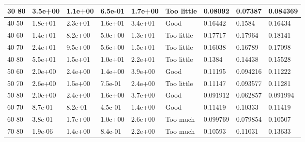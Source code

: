 \begin{tabular}{lllllllll}
30  80 & 3.5e+00 & 1.1e+00 & 6.5e-01 & 1.7e+00 & Too little & 0.08092 & 0.07387 & 0.084369 \\ \hline 
40  50 & 1.8e+01 & 2.3e+01 & 1.6e+01 & 3.4e+01 & Good & 0.16442 & 0.1584 & 0.16434 \\ \hline 
40  60 & 1.4e+01 & 8.2e+00 & 5.0e+00 & 1.3e+01 & Too little & 0.17717 & 0.17964 & 0.18141 \\ \hline 
40  70 & 2.4e+01 & 9.5e+00 & 5.6e+00 & 1.5e+01 & Too little & 0.16038 & 0.16789 & 0.17098 \\ \hline 
40  80 & 5.5e+01 & 1.5e+01 & 1.0e+01 & 2.2e+01 & Too little & 0.1384 & 0.14438 & 0.15528 \\ \hline 
50  60 & 2.0e+00 & 2.4e+00 & 1.4e+00 & 3.9e+00 & Good & 0.11195 & 0.094216 & 0.11222 \\ \hline 
50  70 & 2.6e+00 & 1.5e+00 & 7.5e-01 & 2.4e+00 & Too little & 0.11147 & 0.093577 & 0.11281 \\ \hline 
50  80 & 2.0e+00 & 2.4e+00 & 1.6e+00 & 3.7e+00 & Good & 0.091912 & 0.062857 & 0.091994 \\ \hline 
60  70 & 8.7e-01 & 8.2e-01 & 4.5e-01 & 1.4e+00 & Good & 0.11419 & 0.10333 & 0.11419 \\ \hline 
60  80 & 3.8e-01 & 1.7e+00 & 1.0e+00 & 2.6e+00 & Too much & 0.099769 & 0.079854 & 0.10507 \\ \hline 
70  80 & 1.9e-06 & 1.4e+00 & 8.4e-01 & 2.2e+00 & Too much & 0.10593 & 0.11031 & 0.13633 \\ \hline 
\hline 
\end{tabular}